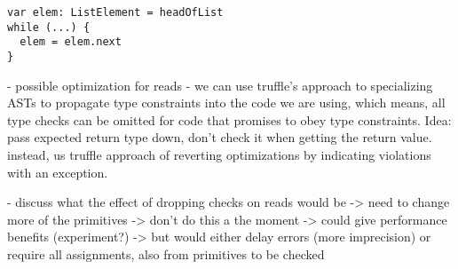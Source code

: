 \begin{lstlisting}[caption={Example for dynamic type checks not corresponding to existing checks.},escapechar=|,label={ex:pathological-case},float,floatplacement=htb]
var elem: ListElement = headOfList
while (...) {
  elem = elem.next
}
\end{lstlisting}


\begin{cnote}



- possible optimization for reads
  - we can use truffle's approach to specializing ASTs to propagate
    type constraints into the code we are using, which means,
    all type checks can be omitted for code that promises to obey
    type constraints.
    Idea: pass expected return type down, don't check it when getting
     the return value. instead, us truffle approach of reverting optimizations
     by indicating violations with an exception.
 
 
 - discuss what the effect of dropping checks on reads would be
   -> need to change more of the primitives
   -> don't do this a the moment
   -> could give performance benefits (experiment?)
   -> but would either delay errors (more imprecision)
      or require all assignments, also from primitives to be checked
\end{cnote}


